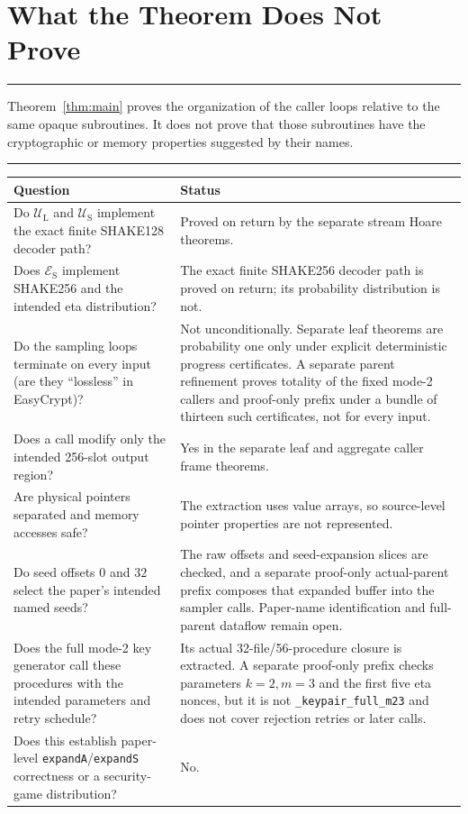 \documentclass[11pt]{article}
\theoremstyle{definition}
\theoremstyle{plain}
\theoremstyle{remark}
\newcommand{\code}[1]{\nolinkurl{#1}}
\newcommand{\UL}{\mathcal U_{\mathrm L}}
\newcommand{\US}{\mathcal U_{\mathrm S}}
\newcommand{\ES}{\mathcal E_{\mathrm S}}
\newenvironment{boundarybox}
  {\begin{center}\begin{minipage}{0.94\linewidth}\color{artifactred}\hrule\vspace{0.6em}\color{black}}
  {\vspace{0.6em}\color{artifactred}\hrule\end{minipage}\end{center}}
\begin{document}
\section{What the Theorem Does Not Prove}

\begin{boundarybox}
Theorem~\ref{thm:main} proves the organization of the caller loops relative to
the same opaque subroutines.  It does not prove that those subroutines have the
cryptographic or memory properties suggested by their names.
\end{boundarybox}

\noindent\begin{tabularx}{\textwidth}{>{\raggedright\arraybackslash}p{}X}
\toprule
Question & Status \\
\midrule
Do $\UL$ and $\US$ implement the exact finite SHAKE128 decoder path? &
Proved on return by the separate stream Hoare theorems. \\
Does $\ES$ implement SHAKE256 and the intended eta distribution? &
The exact finite SHAKE256 decoder path is proved on return; its probability distribution is not. \\
Do the sampling loops terminate on every input (are they ``lossless'' in
EasyCrypt)? &
Not unconditionally.  Separate leaf theorems are probability one only under
explicit deterministic progress certificates.  A separate parent refinement
proves totality of the fixed mode-2 callers and proof-only prefix under a
bundle of thirteen such certificates, not for every input. \\
Does a call modify only the intended 256-slot output region? &
Yes in the separate leaf and aggregate caller frame theorems. \\
Are physical pointers separated and memory accesses safe? &
The extraction uses value arrays, so source-level pointer properties are not
represented. \\
Do seed offsets $0$ and $32$ select the paper's intended named seeds? &
The raw offsets and seed-expansion slices are checked, and a separate
proof-only actual-parent prefix composes that expanded buffer into the
sampler calls.  Paper-name identification and full-parent dataflow remain
open. \\
Does the full mode-2 key generator call these procedures with the intended
parameters and retry schedule? &
Its actual 32-file/56-procedure closure is extracted.  A separate proof-only
prefix checks parameters \(k=2,m=3\) and the first five eta nonces, but it is
not \code{_keypair_full_m23} and does not cover rejection retries or later
calls. \\
Does this establish paper-level \code{expandA}/\code{expandS} correctness or a
security-game distribution? &
No. \\
\bottomrule
\end{tabularx}
\end{document}
